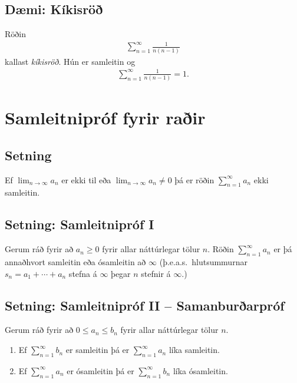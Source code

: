 \documentclass[b5paper,11pt,icelandic]{sphinxmanual}
\begin{document}
\subsection{Dæmi: Kíkisröð}
\label{kafli09:daemi-kikisro}\label{kafli09:index-8}
Röðin
\begin{equation*}
\begin{split}\sum_{n=1}^\infty \frac{1}{n(n-1)}\end{split}
\end{equation*}
kallast \emph{kíkisröð}. Hún er samleitin og
\begin{equation*}
\begin{split}\sum_{n=1}^\infty \frac{1}{n(n-1)} =1.\end{split}
\end{equation*}

\section{Samleitnipróf fyrir raðir}
\label{kafli09:index-9}\label{kafli09:samleitniprof-fyrir-rair}

\subsection{Setning}
\label{kafli09:id9}
Ef \(\lim_{n\rightarrow\infty}a_n\) er ekki til eða
\(\lim_{n\rightarrow\infty}a_n\neq 0\) þá er röðin
\(\sum_{n=1}^\infty a_n\) ekki samleitin.


\subsection{Setning: Samleitnipróf I}
\label{kafli09:setning-samleitniprof-i}
Gerum ráð fyrir að \(a_n\geq 0\) fyrir allar náttúrlegar tölur
\(n\). Röðin \(\sum_{n=1}^\infty a_n\) er þá annaðhvort
samleitin eða ósamleitin að \(\infty\) (þ.e.a.s. hlutsummurnar
\(s_n=a_1+\cdots+a_n\) stefna á \(\infty\) þegar \(n\)
stefnir á \(\infty\).)


\subsection{Setning: Samleitnipróf II – Samanburðarpróf}
\label{kafli09:setning-samleitniprof-ii-samanburarprof}
Gerum ráð fyrir að \(0\leq a_n\leq b_n\) fyrir allar náttúrlegar
tölur \(n\).
\begin{enumerate}
\item {} 
Ef \(\sum_{n=1}^\infty b_n\) er samleitin þá er
\(\sum_{n=1}^\infty a_n\) líka samleitin.

\item {} 
Ef \(\sum_{n=1}^\infty a_n\) er ósamleitin þá er
\(\sum_{n=1}^\infty b_n\) líka ósamleitin.

\end{enumerate}
\end{document}
